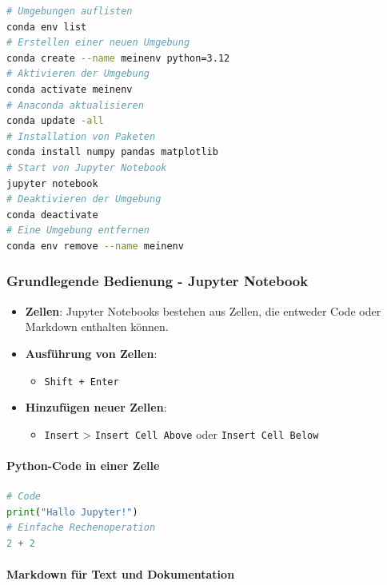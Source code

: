\documentclass{vorlage-design-main}
\begin{document}
\begin{lstlisting}[language=bash]
# Umgebungen auflisten
conda env list
# Erstellen einer neuen Umgebung
conda create --name meinenv python=3.12
# Aktivieren der Umgebung
conda activate meinenv
# Anaconda aktualisieren
conda update -all
# Installation von Paketen
conda install numpy pandas matplotlib
# Start von Jupyter Notebook
jupyter notebook
# Deaktivieren der Umgebung
conda deactivate
# Eine Umgebung entfernen
conda env remove --name meinenv
\end{lstlisting}

\subsubsection{Grundlegende Bedienung - Jupyter
Notebook}\label{grundlegende-bedienung---jupyter-notebook}

\begin{itemize}

\item
  \textbf{Zellen}: Jupyter Notebooks bestehen aus Zellen, die entweder
  Code oder Markdown enthalten können.
\item
  \textbf{Ausführung von Zellen}:

  \begin{itemize}

  \item
    \verb|Shift + Enter|
  \end{itemize}
\item
  \textbf{Hinzufügen neuer Zellen}:

  \begin{itemize}

  \item
    \verb|Insert| \textgreater{}
    \verb|Insert Cell Above| oder
    \verb|Insert Cell Below|
  \end{itemize}
\end{itemize}

\paragraph{Python-Code in einer Zelle}\label{python-code-in-einer-zelle}

\begin{lstlisting}[language=Python]
# Code
print("Hallo Jupyter!")
# Einfache Rechenoperation
2 + 2
\end{lstlisting}

\paragraph{Markdown für Text und
Dokumentation}\label{markdown-fuer-text-und-dokumentation}
\end{document}
